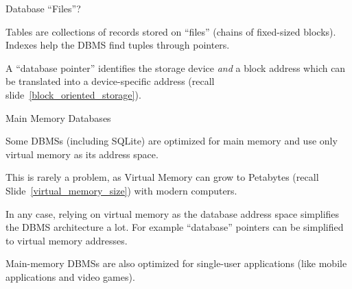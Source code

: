 %
%


\begin{frame}{Database ``Files''?}

Tables are collections of records stored on ``files'' (chains of fixed-sized blocks). Indexes help the DBMS find tuples through pointers.



A ``database pointer'' identifies the storage device \emph{and} a block address which can be translated into a device-specific address (recall slide~\ref{block_oriented_storage}).

\end{frame}


%
%
\begin{frame}{Main Memory Databases}

Some DBMSs (including SQLite) are optimized for main memory and use only virtual memory as its address space.

This is rarely a problem, as Virtual Memory can grow to Petabytes (recall Slide~\ref{virtual_memory_size}) with modern computers.

In any case, relying on virtual memory as the database address space simplifies the DBMS architecture a lot. For example ``database'' pointers can be simplified to virtual memory addresses.

Main-memory DBMSs are also optimized for single-user applications (like mobile applications and video games).

\end{frame}


